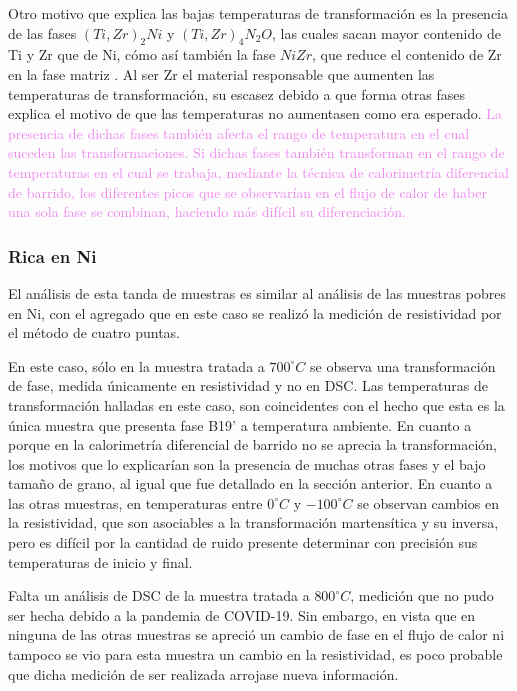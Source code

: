 \documentclass[12pt]{article}
\theoremstyle{definition}
\theoremstyle{remark}
\begin{document}
Otro motivo que explica las bajas temperaturas de transformación es la presencia de las fases $(Ti, Zr)_2 Ni$ y $(Ti, Zr)_4 N_2O$, las cuales sacan mayor contenido de Ti y Zr que de Ni, cómo así también la fase $NiZr$, que reduce el contenido de Zr en la fase matriz \cite{HeeYoungKim2009}. Al ser Zr el material responsable que aumenten las temperaturas de transformación, su escasez debido a que forma otras fases explica el motivo de que las temperaturas no aumentasen como era esperado. \textcolor{violet}{La presencia de dichas fases también afecta el rango de temperatura en el cual suceden las transformaciones. Si dichas fases también transforman en el rango de temperaturas en el cual se trabaja, mediante la técnica de calorimetría diferencial de barrido, los diferentes picos que se observarían en el flujo de calor de haber una sola fase se combinan, haciendo más difícil su diferenciación.}

\subsubsection{Rica en Ni}

El análisis de esta tanda de muestras es similar al análisis de las muestras pobres en Ni, con el agregado que en este caso se realizó la medición de resistividad por el método de cuatro puntas.

En este caso, sólo en la muestra tratada a $700 ^\circ C$ se observa una transformación de fase, medida únicamente en resistividad y no en DSC. Las temperaturas de transformación halladas en este caso, son coincidentes con el hecho que esta es la única muestra que presenta fase B19' a temperatura ambiente. En cuanto a porque en la calorimetría diferencial de barrido no se aprecia la transformación, los motivos que lo explicarían son la presencia de muchas otras fases y el bajo tamaño de grano, al igual que fue detallado en la sección anterior.
En cuanto a las otras muestras, en temperaturas entre $0 ^\circ C$ y $-100 ^\circ C$ se observan cambios en la resistividad, que son asociables a la transformación martensítica y su inversa, pero es difícil por la cantidad de ruido presente determinar con precisión sus temperaturas de inicio y final.

Falta un análisis de DSC de la muestra tratada a $800 ^\circ C$, medición que no pudo ser hecha debido a la pandemia de COVID-19. Sin embargo, en vista que en ninguna de las otras muestras se apreció un cambio de fase en el flujo de calor ni tampoco se vio para esta muestra un cambio en la resistividad, es poco probable que dicha medición de ser realizada arrojase nueva información.
\end{document}
